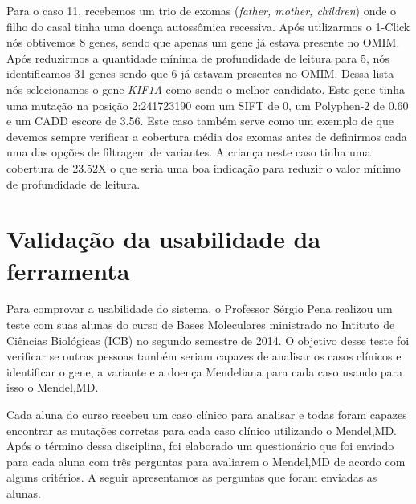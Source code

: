 Para o caso 11, recebemos um trio de exomas (\textit{father, mother, children}) onde o filho do casal tinha uma doença autossômica recessiva. Após utilizarmos o 1-Click nós obtivemos 8 genes, sendo que apenas um gene já estava presente no OMIM. Após reduzirmos a quantidade mínima de profundidade de leitura para 5, nós identificamos 31 genes sendo que 6 já estavam presentes no OMIM. Dessa lista nós selecionamos o gene \textit{KIF1A} como sendo o melhor candidato. Este gene tinha uma mutação na posição 2:241723190 com um SIFT de 0, um Polyphen-2 de 0.60 e um CADD escore de 3.56. Este caso também serve como um exemplo de que devemos sempre verificar a cobertura média dos exomas antes de definirmos cada uma das opções de filtragem de variantes. A criança neste caso tinha uma cobertura de 23.52X o que seria uma boa indicação para reduzir o valor mínimo de profundidade de leitura.


\section{Validação da usabilidade da ferramenta}

Para comprovar a usabilidade do sistema, o Professor Sérgio Pena realizou um teste com suas alunas do curso de Bases Moleculares ministrado no Intituto de Ciências Biológicas (ICB) no segundo semestre de 2014. O objetivo desse teste foi verificar se outras pessoas também seriam capazes de analisar os casos clínicos e identificar o gene, a variante e a doença Mendeliana para cada caso usando para isso o Mendel,MD.

Cada aluna do curso recebeu um caso clínico para analisar e todas foram capazes encontrar as mutações corretas para cada caso clínico utilizando o Mendel,MD. Após o término dessa disciplina, foi elaborado um questionário que foi enviado para cada aluna com três perguntas para avaliarem o Mendel,MD de acordo com alguns critérios. A seguir apresentamos as perguntas que foram enviadas as alunas.

